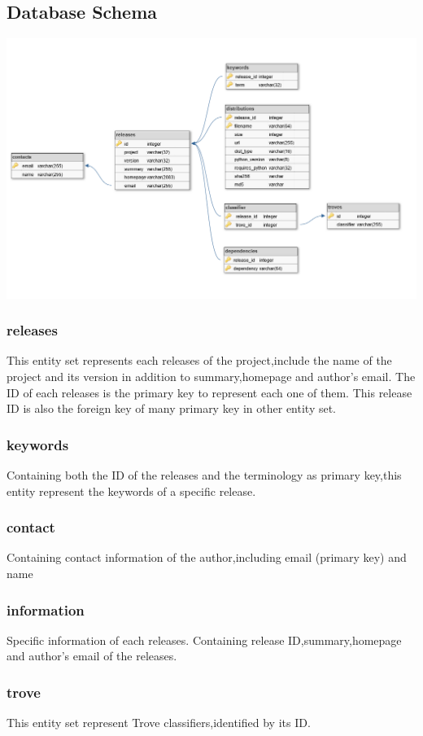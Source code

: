 \documentclass[a4paper,12pt]{article}
\begin{document}
\subsection{Database Schema}
\begin{center}
  \includegraphics[width=\textwidth]{schema.png}
\end{center}

\subsubsection{releases}
This entity set represents each releases of the project,include the name of the project and its version in addition to summary,homepage and author's email. The ID of each releases is the primary key to represent each one of them.
This release ID is also the foreign key of many primary key in other entity set.
\subsubsection{keywords}
Containing both the ID of the releases and the terminology  as primary key,this entity represent the keywords of a specific release.
\subsubsection{contact}
Containing contact information of the author,including email (primary key) and name
\subsubsection{information}
Specific information of each releases. Containing release ID,summary,homepage and author's email of the releases.
\subsubsection{trove}
This entity set represent Trove classifiers,identified by its ID.
\end{document}
